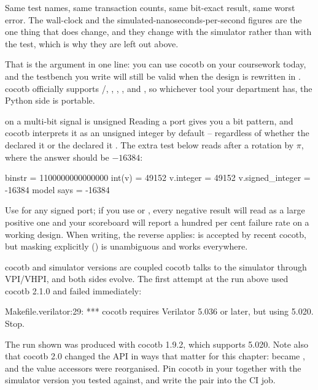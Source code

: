 Same test names, same transaction counts, same bit-exact result, same worst
error. The wall-clock and the simulated-nanoseconds-per-second figures are the
one thing that does change, and they change with the simulator rather than
with the test, which is why they are left out above.

That is the argument in one line: you can use cocotb on your \VHDL{}
coursework today, and the testbench you write will still be valid when the
design is rewritten in \SV{}. cocotb officially supports
/, , ,
,  and , so whichever
tool your department has, the Python side is portable.

\begin{gotcha}{ on a multi-bit signal is unsigned}
Reading a port gives you a bit pattern, and cocotb interprets it as an
unsigned integer by default -- regardless of whether the \SV{} declared it
  or the \VHDL{} declared it . The extra
test below reads  after a rotation by \(\pi\), where the
answer should be \(-16384\):
\begin{txtcode}
binstr           = 1100000000000000
int(v)           = 49152
v.integer        = 49152
v.signed_integer = -16384
model says       = -16384
\end{txtcode}
Use  for any signed port; if you use 
or , every negative result will read as a large positive one and
your scoreboard will report a hundred per cent failure rate on a working
design. When writing, the reverse applies: 
is accepted by recent cocotb, but masking explicitly
() is unambiguous and works everywhere.
\end{gotcha}

\begin{gotcha}{cocotb and simulator versions are coupled}
cocotb talks to the simulator through VPI/VHPI, and both sides evolve. The
first attempt at the run above used cocotb 2.1.0 and failed immediately:
\begin{txtcode}
Makefile.verilator:29: *** cocotb requires Verilator 5.036 or later,
                           but using 5.020.  Stop.
\end{txtcode}
The run shown was produced with cocotb 1.9.2, which supports
 5.020. Note also that cocotb 2.0 changed the API in ways
that matter for this chapter:  became , and the
value accessors were reorganised. Pin cocotb in your
 together with the simulator version you tested
against, and write the pair into the CI job.
\end{gotcha}

